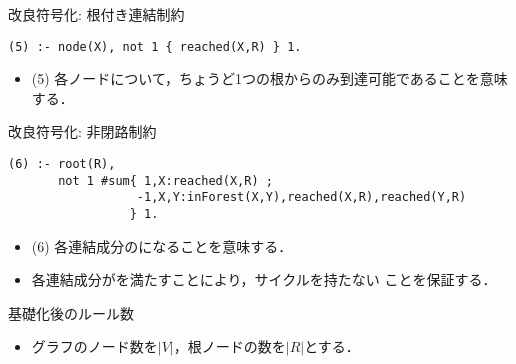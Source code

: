 \begin{frame}[fragile]{改良符号化: 根付き連結制約}
\begin{exampleblock}{}\small
\begin{lstlisting}
(5) :- node(X), not 1 { reached(X,R) } 1.
\end{lstlisting}
\end{exampleblock}
\vfill
\begin{itemize}
\item (5) 各ノードについて，ちょうど1つの根からのみ到達可能であることを意味する．
\end{itemize}
\end{frame}
\begin{frame}[fragile]{改良符号化: 非閉路制約}
\begin{minipage}[c]{1.01\textwidth}
\begin{exampleblock}{}\small
\begin{lstlisting}
(6) :- root(R),
       not 1 #sum{ 1,X:reached(X,R) ;
                  -1,X,Y:inForest(X,Y),reached(X,R),reached(Y,R)
                 } 1.
\end{lstlisting}
\end{exampleblock}
\end{minipage}
\vfill
\begin{itemize}
\item (6) 各連結成分のになることを意味する．
\item 各連結成分がを満たすことにより，サイクルを持たない
	  ことを保証する．
\end{itemize}
\end{frame}
\begin{frame}{基礎化後のルール数}
  \begin{itemize}
  \item グラフのノード数を$|V|$，根ノードの数を$|R|$とする．
  \end{itemize}
  \begin{table}[t]
    \centering
    
  \end{table}
\end{frame}

